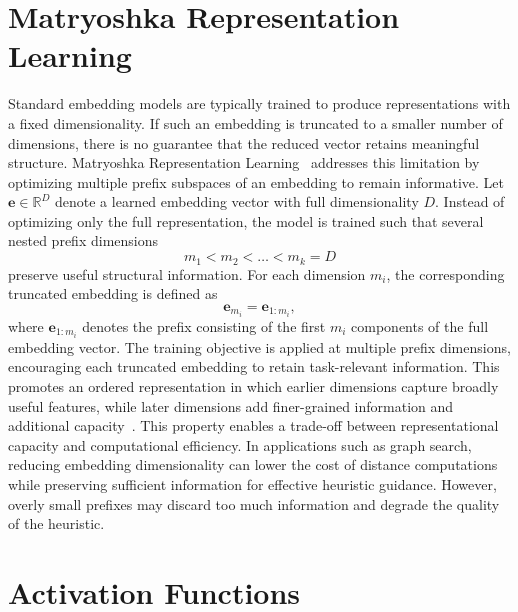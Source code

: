 \section{Matryoshka Representation Learning}
\label{sec:foundations_matryoshka}

Standard embedding models are typically trained to produce representations with a fixed dimensionality. If such an embedding is truncated to a smaller number of dimensions, there is no guarantee that the reduced vector retains meaningful structure. Matryoshka Representation Learning~\cite{kusupati:2022} addresses this limitation by optimizing multiple prefix subspaces of an embedding to remain informative. Let $\mathbf{e} \in \mathbb{R}^{D}$ denote a learned embedding vector with full dimensionality $D$. Instead of optimizing only the full representation, the model is trained such that several nested prefix dimensions
\[
m_1 < m_2 < \dots < m_k = D
\]
preserve useful structural information. For each dimension $m_i$, the corresponding truncated embedding is defined as
\[
\mathbf{e}_{m_i} = \mathbf{e}_{1:m_i},
\]
where $\mathbf{e}_{1:m_i}$ denotes the prefix consisting of the first $m_i$ components of the full embedding vector. The training objective is applied at multiple prefix dimensions, encouraging each truncated embedding to retain task-relevant information. This promotes an ordered representation in which earlier dimensions capture broadly useful features, while later dimensions add finer-grained information and additional capacity~\cite{kusupati:2022}. This property enables a trade-off between representational capacity and computational efficiency. In applications such as graph search, reducing embedding dimensionality can lower the cost of distance computations while preserving sufficient information for effective heuristic guidance. However, overly small prefixes may discard too much information and degrade the quality of the heuristic.

\section{Activation Functions}
\label{sec:foundations_activation}

